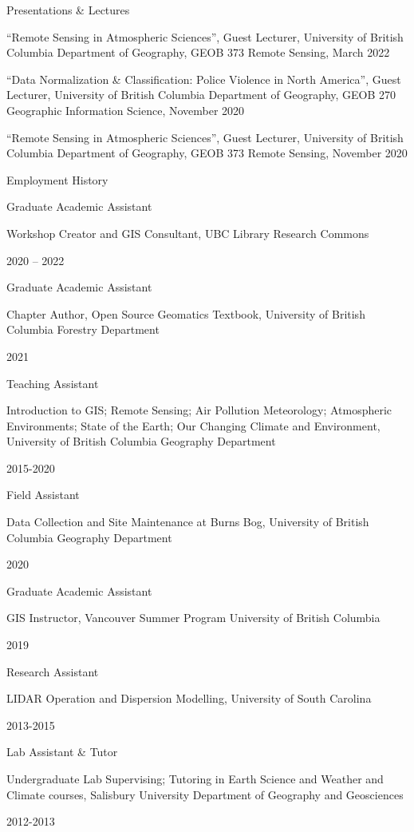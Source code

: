 \documentclass[
]{article}
\begin{document}
Presentations \& Lectures

``Remote Sensing in Atmospheric Sciences'', Guest Lecturer, University
of British Columbia Department of Geography, GEOB 373 Remote Sensing,
March 2022

``Data Normalization \& Classification: Police Violence in North
America'', Guest Lecturer, University of British Columbia Department of
Geography, GEOB 270 Geographic Information Science, November 2020

``Remote Sensing in Atmospheric Sciences'', Guest Lecturer, University
of British Columbia Department of Geography, GEOB 373 Remote Sensing,
November 2020

Employment History

Graduate Academic Assistant

Workshop Creator and GIS Consultant, UBC Library Research Commons

2020 -- 2022

Graduate Academic Assistant

Chapter Author, Open Source Geomatics Textbook, University of British
Columbia Forestry Department

2021

Teaching Assistant

Introduction to GIS; Remote Sensing; Air Pollution Meteorology;
Atmospheric Environments; State of the Earth; Our Changing Climate and
Environment, University of British Columbia Geography Department

2015-2020

Field Assistant

Data Collection and Site Maintenance at Burns Bog, University of British
Columbia Geography Department

2020

Graduate Academic Assistant

GIS Instructor, Vancouver Summer Program University of British Columbia

2019

Research Assistant

LIDAR Operation and Dispersion Modelling, University of South Carolina

2013-2015

Lab Assistant \& Tutor

Undergraduate Lab Supervising; Tutoring in Earth Science and Weather and
Climate courses, Salisbury University Department of Geography and
Geosciences

2012-2013
\end{document}
